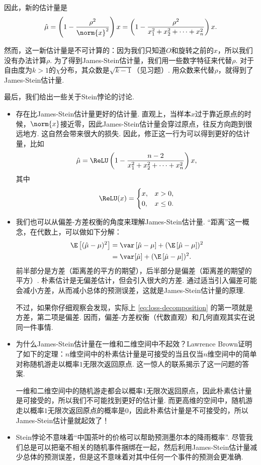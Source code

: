 因此，新的估计量是
\[\hat\mu = \left(1-\frac{\rho^2}{\norm{x}^2}\right)x=\left(1-\frac{\rho^2}{x_1^2+x_2^2+\dots+x_n^2}\right)x.\]

然而，这一新估计量是不可计算的：因为我们只知道$O$和旋转之前的$x$，所以我们没有办法计算$\rho$. 为了得到James-Stein估计量，我们用一些数字特征来代替$\rho$. 对于自由度为$k>1$的$\chi$分布，其众数是$\sqrt{k-1}$（见习题）. 用众数来代替$\rho$，就得到了James-Stein估计量. 

最后，我们给出一些关于Stein悖论的讨论. 

\begin{itemize}
    \item 存在比James-Stein估计量更好的估计量. 直观上，当样本$x$过于靠近原点的时候，$\norm{x}$接近零，因此James-Stein估计量会穿过原点，往反方向跑到很远地方. 这自然会带来很大的损失. 因此，修正这一行为可以得到更好的估计量，比如
    \[\hat\mu=\ReLU\left(1-\frac{n-2}{x_1^2+x_2^2+\dots+x_n^2}\right)x,\]
    其中
    \[\ReLU(x)=\begin{cases}
        x, & x>0,\\
        0, & x\leq 0.
    \end{cases}\]
    \item 我们也可以从偏差-方差权衡的角度来理解James-Stein估计量. “距离”这一概念，在代数上，可以做如下分解：
    \begin{align*}
    \E\left[(\hat{\mu}-\mu)^2\right] &= \var \left[\hat{\mu}-\mu\right] + (\E\left[\hat{\mu}-\mu\right])^2 \\
    &= \var [\hat{\mu}] + (\E\left[\hat{\mu}-\mu\right])^2.
    \end{align*}
    前半部分是方差（距离差的平方的期望），后半部分是偏差（距离差的期望的平方）. 朴素估计是无偏差估计，但会引入很大的方差. 通过适当引入偏差可能会减小方差，从而减小总体的预测误差，这就是James-Stein估计量的原理. 
    
    不过，如果你仔细观察会发现，实际上 \eqref{eq:loss-decomposition} 的第一项就是方差，第二项是偏差. 因而，偏差-方差权衡（代数直观）和几何直观其实在说同一件事情. 

    \item 为什么James-Stein估计量在一维和二维空间中不起效？Lawrence Brown证明了如下的定理：$n$维空间中的朴素估计量是可接受的当且仅当$n$维空间中的简单对称随机游走以概率$1$无限次返回原点. 这一惊人的联系揭示了这一问题的答案. 
    
    一维和二维空间中的随机游走都会以概率$1$无限次返回原点，因此朴素估计量是可接受的，所以我们不可能找到更好的估计量. 而更高维的空间中，随机游走以概率$1$无限次返回原点的概率是$0$，因此朴素估计量是不可接受的，所以James-Stein估计量就起效了！

    \item Stein悖论不意味着“中国茶叶的价格可以帮助预测墨尔本的降雨概率”. 尽管我们总是可以把毫不相关的随机事件捆绑在一起，然后利用James-Stein估计量减少总体的预测误差，但是这不意味着对其中任何一个事件的预测会更准确. 
\end{itemize}


